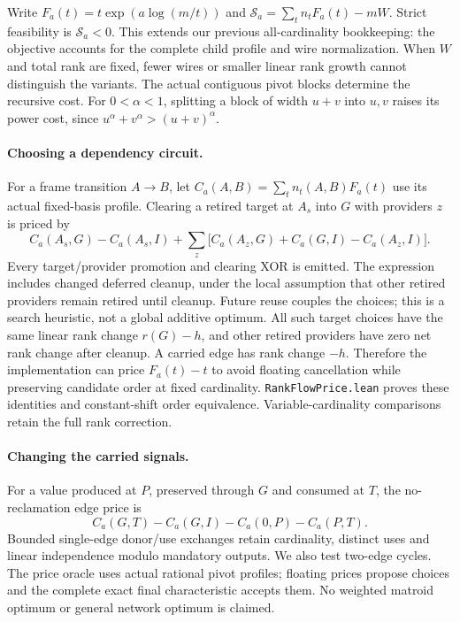 \documentclass[11pt]{article}
\begin{document}
Write $F_a(t)=t\exp(a\log(m/t))$ and
$\mathcal S_a=\sum_t n_tF_a(t)-mW$. Strict feasibility is
$\mathcal S_a<0$. This extends our previous all-cardinality bookkeeping:
the objective accounts for the complete child profile and wire normalization.
When $W$ and total rank are fixed, fewer wires or smaller linear rank growth
cannot distinguish the variants. The actual contiguous pivot blocks determine
the recursive cost. For $0<\alpha<1$, splitting a block of width $u+v$ into
$u,v$ raises its power cost, since $u^\alpha+v^\alpha>(u+v)^\alpha$.

\paragraph{Choosing a dependency circuit.}
For a frame transition $A\to B$, let
$C_a(A,B)=\sum_t n_t(A,B)F_a(t)$ use its actual fixed-basis profile.
Clearing a retired target at $A_s$ into $G$ with providers $z$ is priced by
\[
 C_a(A_s,G)-C_a(A_s,I)+
 \sum_z\bigl[C_a(A_z,G)+C_a(G,I)-C_a(A_z,I)\bigr].
\]
Every target/provider promotion and clearing XOR is emitted. The expression
includes changed deferred cleanup, under the local assumption that other
retired providers remain retired until cleanup. Future reuse couples the
choices; this is a search heuristic, not a global additive optimum.
All such target choices have the same linear rank change $r(G)-h$, and other
retired providers have zero net rank change after cleanup. A carried edge has
rank change $-h$. Therefore the implementation can price $F_a(t)-t$ to avoid
floating cancellation while preserving candidate order at fixed cardinality.
\texttt{RankFlowPrice.lean} proves these identities and constant-shift order
equivalence. Variable-cardinality comparisons retain the full rank correction.

\paragraph{Changing the carried signals.}
For a value produced at $P$, preserved through $G$ and consumed at $T$, the
no-reclamation edge price is
\[
 C_a(G,T)-C_a(G,I)-C_a(0,P)-C_a(P,T).
\]
Bounded single-edge donor/use exchanges retain cardinality, distinct uses and
linear independence modulo mandatory outputs. We also test two-edge cycles.
The price oracle uses actual rational pivot profiles; floating prices propose
choices and the complete exact final characteristic accepts them. No weighted
matroid optimum or general network optimum is claimed.
\end{document}
